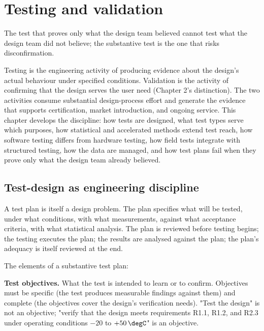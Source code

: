 \chapter{Testing and validation}
\label{vol11:ch08}

\epigraph{The test that proves only what the design team believed cannot test what the design team did not believe; the substantive test is the one that risks disconfirmation.}{}


\noindent
Testing is the engineering activity of producing evidence about the design's actual behaviour under specified conditions. Validation is the activity of confirming that the design serves the user need (Chapter 2's distinction). The two activities consume substantial design-process effort and generate the evidence that supports certification, market introduction, and ongoing service. This chapter develops the discipline: how tests are designed, what test types serve which purposes, how statistical and accelerated methods extend test reach, how software testing differs from hardware testing, how field tests integrate with structured testing, how the data are managed, and how test plans fail when they prove only what the design team already believed.

\section{Test-design as engineering discipline}

A test plan is itself a design problem. The plan specifies what will be tested, under what conditions, with what measurements, against what acceptance criteria, with what statistical analysis. The plan is reviewed before testing begins; the testing executes the plan; the results are analysed against the plan; the plan's adequacy is itself reviewed at the end.

The elements of a substantive test plan:

\textbf{Test objectives.} What the test is intended to learn or to confirm. Objectives must be specific (the test produces measurable findings against them) and complete (the objectives cover the design's verification needs). "Test the design" is not an objective; "verify that the design meets requirements R1.1, R1.2, and R2.3 under operating conditions $-20$ to $+50\,\degC$" is an objective.

